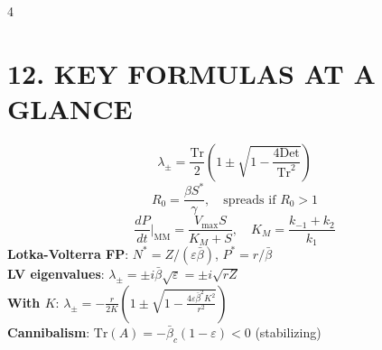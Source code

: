 \documentclass[8pt,landscape]{article}
\begin{document}
\begin{multicols}{4}
\section{12. KEY FORMULAS AT A GLANCE}

\[
\lambda_\pm = \frac{\text{Tr}}{2}\left(1 \pm \sqrt{1 - \frac{4\text{Det}}{\text{Tr}^2}}\right)
\]
\[
R_0 = \frac{\beta S^*}{\gamma}, \quad \text{spreads if } R_0 > 1
\]
\[
\frac{dP}{dt}\bigg|_{\text{MM}} = \frac{V_{\max} S}{K_M + S}, \quad K_M = \frac{k_{-1}+k_2}{k_1}
\]
\textbf{Lotka-Volterra FP}: $N^* = Z/(\varepsilon\bar\beta)$, $P^* = r/\bar\beta$\\
\textbf{LV eigenvalues}: $\lambda_\pm = \pm i\bar\beta\sqrt\varepsilon = \pm i\sqrt{rZ}$\\
\textbf{With $K$}: $\lambda_\pm = -\frac{r}{2K}\!\left(1 \pm \sqrt{1 - \frac{4\varepsilon\bar\beta^2 K^2}{r^2}}\right)$\\
\textbf{Cannibalism}: $\text{Tr}(A) = -\bar\beta_c(1-\varepsilon) < 0$ (stabilizing)

\end{multicols}
\end{document}
